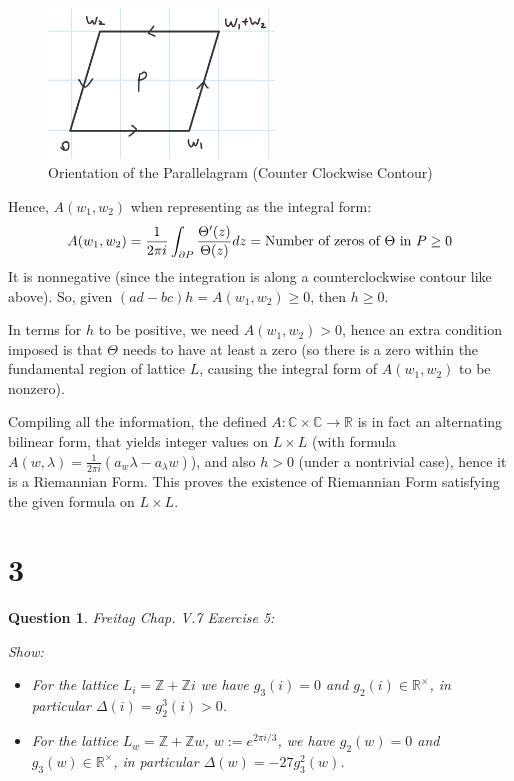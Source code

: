 \documentclass{article}
\newtheorem{question}{Question}
\begin{document}
\begin{itemize}
    \begin{figure}[h!]
        \begin{center}
            \includegraphics*[width=60mm]{q2 orient 2.jpg}
            \caption{Orientation of the Parallelagram (Counter Clockwise Contour)}
        \end{center}
    \end{figure}

    Hence, $A(w_1,w_2)$ when representing as the integral form:
    $$A(w_1,w_2)=\frac{1}{2\pi i}\int_{\partial P}\frac{\Theta'(z)}{\Theta(z)}dz = \textmd{Number of zeros of }\Theta \textmd{ in } P \geq 0$$
    It is nonnegative (since the integration is along a counterclockwise contour like above). So, given $(ad-bc)h = A(w_1,w_2)\geq 0$, then $h \geq 0$.

    In terms for $h$ to be positive, we need $A(w_1,w_2)>0$, hence an extra condition imposed is that $\Theta$ needs to have at least a zero (so there is a zero within the fundamental region of lattice $L$, causing the integral form of $A(w_1,w_2)$ to be nonzero).

    \hfil

    Compiling all the information, the defined $A:\mathbb{C}\times \mathbb{C}\rightarrow\mathbb{R}$ is in fact an alternating bilinear form, that yields integer values on $L\times L$ (with formula $A(w,\lambda)=\frac{1}{2\pi i}(a_w\lambda-a_\lambda w)$), and also $h>0$ (under a nontrivial case), hence it is a Riemannian Form. This proves the existence of Riemannian Form satisfying the given formula on $L\times L$.
\end{itemize}

\break

\section*{3}
\begin{myBox}[]{}
    \begin{question}
        Freitag Chap. V.7 Exercise 5:

        Show:
        \begin{itemize}
            \item[(a)] For the lattice $L_i=\mathbb{Z}+\mathbb{Z}i$ we have $g_3(i)=0$ and $g_2(i)\in\mathbb{R}^\times$, in particular $\Delta(i)=g_2^3(i)>0$.
            \item[(b)] For the lattice $L_w=\mathbb{Z}+\mathbb{Z}w$, $w:=e^{2\pi i/3}$, we have $g_2(w)=0$ and $g_3(w)\in\mathbb{R}^\times$, in particular $\Delta(w)=-27g_3^2(w)$. 
        \end{itemize}
    \end{question}
\end{myBox}
\end{document}
